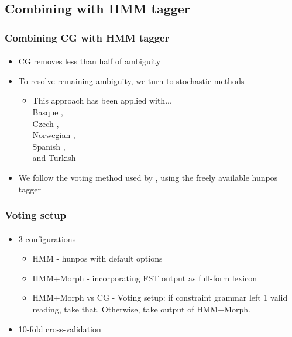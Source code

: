 \documentclass{beamer}
\begin{document}
\subsection{Combining with HMM tagger} %

\begin{frame}
\frametitle{Combining CG with HMM tagger}
\framesubtitle{}
\begin{itemize}
	\item CG removes less than half of ambiguity
	\pause
	\item To resolve remaining ambiguity, we turn to stochastic methods
	\begin{itemize}
		\item This approach has been applied with...\\
		Basque \cite{ezeiza.ea-98},\\
		Czech \cite{hajic.ea-01,hajic.ea-07},\\
		Norwegian \cite{johannessen.ea-11,johannessen.ea-12},\\
		Spanish \cite{hulden12},\\
		and Turkish \cite{oflazer.tur-96}
		\pause
	\end{itemize}
	\item We follow the voting method used by \cite{hulden12}, using the freely available hunpos tagger
\end{itemize}
\end{frame}

\begin{frame}
\frametitle{Voting setup}
\framesubtitle{}
\begin{itemize}
	\item 3 configurations
	\begin{itemize}
		\item HMM - hunpos with default options
		\pause
		\item HMM+Morph - incorporating FST output as full-form lexicon
		\pause
		\item HMM+Morph vs CG - Voting setup: if constraint grammar left 1 valid reading,
		take that. Otherwise, take output of HMM+Morph.
	\end{itemize}
	\pause
	\item 10-fold cross-validation
\end{itemize}
\end{frame}
\end{document}
